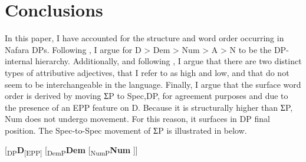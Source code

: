 \documentclass[output=paper]{langscibook}
\begin{document}
\section{Conclusions}
\label{sec:baron:3}
In this paper, I have accounted for the structure and word order occurring in Nafara DPs. Following \citet{Cinque2005}, I argue for D > Dem > Num > A > N to be the DP-internal hierarchy. Additionally, and following \citet{Cinque2010}, I argue that there are two distinct types of attributive adjectives, that I refer to as high and low, and that do not seem to be interchangeable in the language. Finally, I argue that the surface word order is derived by moving ƩP to Spec,DP, for agreement purposes and due to the presence of an EPP feature on D. Because it is structurally higher than ƩP, Num does not undergo movement. For this reason, it surfaces in DP final position. The Spec-to-Spec movement of ƩP is illustrated in  below.

\ea\label{ex:baron:20}\small
[\textsubscript{DP}\textbf{D}\textsubscript{[EPP]} [\textsubscript{DemP}\textbf{Dem} [\textsubscript{NumP}\textbf{Num} ]]
\z
  








 

\end{document}
